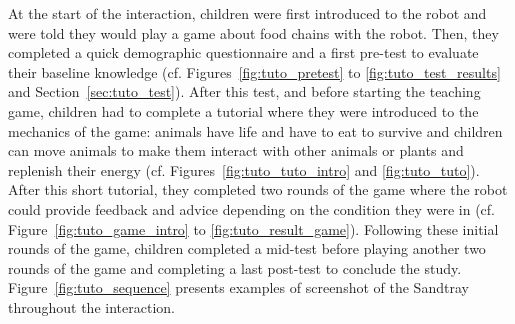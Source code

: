 At the start of the interaction, children were first introduced to the robot and were told they would play a game about food chains with the robot. Then, they completed a quick demographic questionnaire and a first pre-test to evaluate their baseline knowledge (cf. Figures~\ref{fig:tuto_pretest} to \ref{fig:tuto_test_results} and Section~\ref{sec:tuto_test}). After this test, and before starting the teaching game, children had to complete a tutorial where they were introduced to the mechanics of the game: animals have life and have to eat to survive and children can move animals to make them interact with other animals or plants and replenish their energy (cf. Figures~\ref{fig:tuto_tuto_intro} and \ref{fig:tuto_tuto}). After this short tutorial, they completed two rounds of the game where the robot could provide feedback and advice depending on the condition they were in (cf. Figure~\ref{fig:tuto_game_intro} to \ref{fig:tuto_result_game}). Following these initial rounds of the game, children completed a mid-test before playing another two rounds of the game and completing a last post-test to conclude the study. Figure~\ref{fig:tuto_sequence} presents examples of screenshot of the Sandtray throughout the interaction.


